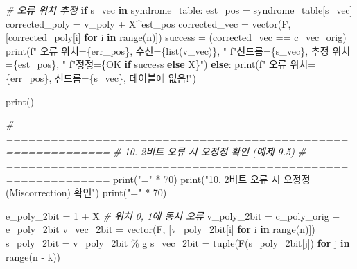 \documentclass[
  oneside]{article}
\newenvironment{Shaded}{}{}
\newcommand{\BuiltInTok}[1]{\textcolor[rgb]{0.00,0.50,0.00}{#1}}
\newcommand{\CommentTok}[1]{\textcolor[rgb]{0.38,0.63,0.69}{\textit{#1}}}
\newcommand{\ControlFlowTok}[1]{\textcolor[rgb]{0.00,0.44,0.13}{\textbf{#1}}}
\newcommand{\DecValTok}[1]{\textcolor[rgb]{0.25,0.63,0.44}{#1}}
\newcommand{\KeywordTok}[1]{\textcolor[rgb]{0.00,0.44,0.13}{\textbf{#1}}}
\newcommand{\NormalTok}[1]{#1}
\newcommand{\OperatorTok}[1]{\textcolor[rgb]{0.40,0.40,0.40}{#1}}
\newcommand{\SpecialCharTok}[1]{\textcolor[rgb]{0.25,0.44,0.63}{#1}}
\newcommand{\SpecialStringTok}[1]{\textcolor[rgb]{0.73,0.40,0.53}{#1}}
\newcommand{\StringTok}[1]{\textcolor[rgb]{0.25,0.44,0.63}{#1}}
\begin{document}
\begin{Shaded}
\begin{Highlighting}[]
    \CommentTok{\# 오류 위치 추정}
    \ControlFlowTok{if}\NormalTok{ s\_vec }\KeywordTok{in}\NormalTok{ syndrome\_table:}
\NormalTok{        est\_pos }\OperatorTok{=}\NormalTok{ syndrome\_table[s\_vec]}
\NormalTok{        corrected\_poly }\OperatorTok{=}\NormalTok{ v\_poly }\OperatorTok{+}\NormalTok{ X}\OperatorTok{\^{}}\NormalTok{est\_pos}
\NormalTok{        corrected\_vec }\OperatorTok{=}\NormalTok{ vector(F, [corrected\_poly[i] }\ControlFlowTok{for}\NormalTok{ i }\KeywordTok{in} \BuiltInTok{range}\NormalTok{(n)])}
\NormalTok{        success }\OperatorTok{=}\NormalTok{ (corrected\_vec }\OperatorTok{==}\NormalTok{ c\_vec\_orig)}
        \BuiltInTok{print}\NormalTok{(}\SpecialStringTok{f"  오류 위치=}\SpecialCharTok{\{}\NormalTok{err\_pos}\SpecialCharTok{\}}\SpecialStringTok{, 수신=}\SpecialCharTok{\{}\BuiltInTok{list}\NormalTok{(v\_vec)}\SpecialCharTok{\}}\SpecialStringTok{, "}
              \SpecialStringTok{f"신드롬=}\SpecialCharTok{\{}\NormalTok{s\_vec}\SpecialCharTok{\}}\SpecialStringTok{, 추정 위치=}\SpecialCharTok{\{}\NormalTok{est\_pos}\SpecialCharTok{\}}\SpecialStringTok{, "}
              \SpecialStringTok{f"정정=}\SpecialCharTok{\{}\StringTok{\textquotesingle{}OK\textquotesingle{}} \ControlFlowTok{if}\NormalTok{ success }\ControlFlowTok{else} \StringTok{\textquotesingle{}X\textquotesingle{}}\SpecialCharTok{\}}\SpecialStringTok{"}\NormalTok{)}
    \ControlFlowTok{else}\NormalTok{:}
        \BuiltInTok{print}\NormalTok{(}\SpecialStringTok{f"  오류 위치=}\SpecialCharTok{\{}\NormalTok{err\_pos}\SpecialCharTok{\}}\SpecialStringTok{, 신드롬=}\SpecialCharTok{\{}\NormalTok{s\_vec}\SpecialCharTok{\}}\SpecialStringTok{, 테이블에 없음!"}\NormalTok{)}

\BuiltInTok{print}\NormalTok{()}

\CommentTok{\# ============================================================}
\CommentTok{\# 10. 2비트 오류 시 오정정 확인 (예제 9.5)}
\CommentTok{\# ============================================================}
\BuiltInTok{print}\NormalTok{(}\StringTok{"="} \OperatorTok{*} \DecValTok{70}\NormalTok{)}
\BuiltInTok{print}\NormalTok{(}\StringTok{"10. 2비트 오류 시 오정정(Miscorrection) 확인"}\NormalTok{)}
\BuiltInTok{print}\NormalTok{(}\StringTok{"="} \OperatorTok{*} \DecValTok{70}\NormalTok{)}

\NormalTok{e\_poly\_2bit }\OperatorTok{=} \DecValTok{1} \OperatorTok{+}\NormalTok{ X  }\CommentTok{\# 위치 0, 1에 동시 오류}
\NormalTok{v\_poly\_2bit }\OperatorTok{=}\NormalTok{ c\_poly\_orig }\OperatorTok{+}\NormalTok{ e\_poly\_2bit}
\NormalTok{v\_vec\_2bit }\OperatorTok{=}\NormalTok{ vector(F, [v\_poly\_2bit[i] }\ControlFlowTok{for}\NormalTok{ i }\KeywordTok{in} \BuiltInTok{range}\NormalTok{(n)])}
\NormalTok{s\_poly\_2bit }\OperatorTok{=}\NormalTok{ v\_poly\_2bit }\OperatorTok{\%}\NormalTok{ g}
\NormalTok{s\_vec\_2bit }\OperatorTok{=} \BuiltInTok{tuple}\NormalTok{(F(s\_poly\_2bit[j]) }\ControlFlowTok{for}\NormalTok{ j }\KeywordTok{in} \BuiltInTok{range}\NormalTok{(n }\OperatorTok{{-}}\NormalTok{ k))}


\end{Highlighting}
\end{Shaded}
\end{document}
